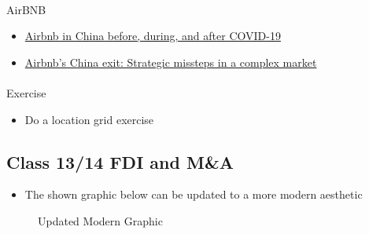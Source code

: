 \documentclass[
  11pt,
]{article}
\makeatletter
\let\oldparagraph\paragraph
\renewcommand{\paragraph}{
    \@ifstar
      \xxxParagraphStar
      \xxxParagraphNoStar
  }
\newcommand{\xxxParagraphStar}[1]{\oldparagraph*{#1}\mbox{}}
\newcommand{\xxxParagraphNoStar}[1]{\oldparagraph{#1}\mbox{}}
\providecommand{\tightlist}{%
  \setlength{\itemsep}{0pt}\setlength{\parskip}{0pt}}
\makeatother
\begin{document}
\paragraph{AirBNB}\label{airbnb}

\begin{itemize}
\tightlist
\item
  \href{https://uq.pressbooks.pub/airbnb-978-1-74272-321-1/chapter/airbnb-in-china-before-during-and-after-covid-19/}{Airbnb
  in China before, during, and after COVID-19}
\item
  \href{https://medium.com/eastora-insights/airbnbs-china-exit-strategic-missteps-in-a-complex-market-86a26602e08d}{Airbnb's
  China exit: Strategic missteps in a complex market}
\end{itemize}

\paragraph{Exercise}\label{exercise}

\begin{itemize}
\tightlist
\item
  Do a location grid exercise
\end{itemize}

\subsection{Class 13/14 FDI and M\&A}\label{class13-14}

\begin{itemize}
\tightlist
\item
  The shown graphic below can be updated to a more modern aesthetic
\end{itemize}

\begin{figure}[H]


\caption{\label{fig-2}Updated Modern Graphic}

\end{figure}%
\end{document}

